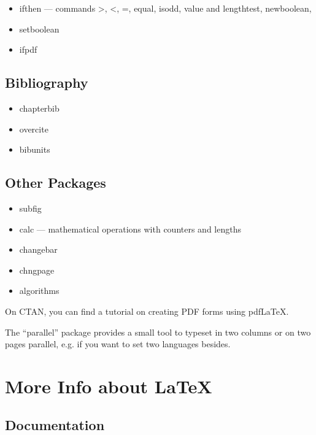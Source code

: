 \documentclass{mcreport}
\begin{document}
\begin{itemize}
    \item ifthen --- commands >, <, =, equal, isodd, value and lengthtest,
    newboolean,
    \item setboolean
    \item ifpdf
\end{itemize}

\subsection{Bibliography}
\label{sec:bibliography}

\begin{itemize}
    \item chapterbib
    \item overcite
    \item bibunits
\end{itemize}

\subsection{Other Packages}
\label{sec:others}

\begin{itemize}
    \item subfig
    \item calc --- mathematical operations with counters and lengths
    \item changebar
    \item chngpage
    \item algorithms
\end{itemize}

On CTAN, you can find a tutorial on creating PDF forms using pdfLaTeX.

The ``parallel'' package provides a small tool to typeset in two columns or
on two pages parallel, e.g. if you want to set two languages besides.


\section{More Info about \LaTeX{}}
\label{sec:more-info-about}

\subsection{Documentation}
\label{sec:documentation}
\end{document}
